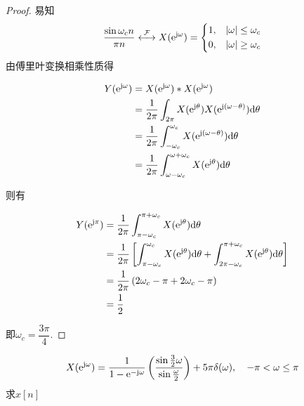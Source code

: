 \begin{proof}

    易知
    $$\dfrac{\sin{\omega_c n}}{{\pi n}} \stackrel{\mathcal{F}}{\longleftrightarrow} X(\mathrm{e}^{\mathrm{j} \omega}) = \left\{
        \begin{aligned}
            & 1, & |\omega| \leq \omega_c \\
            & 0, & |\omega| \geq \omega_c 
        \end{aligned}
        \right.
    $$
    由傅里叶变换相乘性质得
    
    \begin{align*}
        Y(\mathrm{e}^{\mathrm{j} \omega}) & = X(\mathrm{e}^{\mathrm{j} \omega}) \ast X(\mathrm{e}^{\mathrm{j} \omega}) \\
        & = \dfrac{1}{2\pi} \int_{2\pi}{X(\mathrm{e}^{\mathrm{j} \theta}) X(\mathrm{e}^{\mathrm{j} (\omega - \theta)})}\mathrm{d} \theta \\
        & = \dfrac{1}{2\pi} \int_{-\omega_c}^{\omega_c}{X(\mathrm{e}^{\mathrm{j} (\omega - \theta)})}\mathrm{d} \theta \\
        & = \dfrac{1}{2\pi} \int_{\omega -\omega_c}^{\omega + \omega_c}{X(\mathrm{e}^{\mathrm{j} \theta})}\mathrm{d} \theta
    \end{align*}

    则有
    
    \begin{align*}
        Y(\mathrm{e}^{\mathrm{j} \pi}) & = \dfrac{1}{2\pi} \int_{\pi -\omega_c}^{\pi + \omega_c}{X(\mathrm{e}^{\mathrm{j} \theta})}\mathrm{d} \theta \\
        & = \dfrac{1}{2\pi} \left[\int_{\pi -\omega_c}^{\omega_c}{X(\mathrm{e}^{\mathrm{j} \theta})}\mathrm{d} \theta + \int_{2\pi - \omega_c}^{\pi + \omega_c}{X(\mathrm{e}^{\mathrm{j} \theta})}\mathrm{d} \theta \right] \\
        & = \dfrac{1}{2\pi} \left(2\omega_c - \pi + 2\omega_c - \pi\right) \\
        & = \dfrac{1}{2} 
    \end{align*}

    即$\omega_c = \dfrac{3\pi}{4}$.

\end{proof}

\begin{proposition}

    $$X(\mathrm{e}^{\mathrm{j} \omega}) = \dfrac{1}{1 - \mathrm{e}^{-\mathrm{j} \omega}}\left( \dfrac{\sin{\frac{3}{2}\omega}}{\sin{\frac{\omega}{2}}}\right) + 5\pi \delta(\omega), \quad -\pi < \omega \leq \pi$$
    求$x[n]$

\end{proposition}

